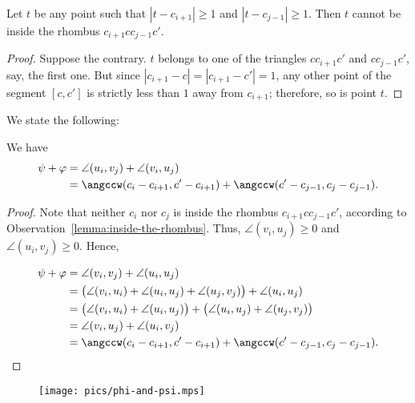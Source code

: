 \begin{enumerate}[label={\bf Case \arabic*: }, wide, labelwidth=!, labelindent=0pt]
\begin{observation} \label{lemma:inside-the-rhombus}
Let $t$ be any point such that $|t - c_{i+1}|\geq 1$ and $|t - c_{j-1}| \geq 1$. Then $t$ cannot be inside the rhombus $c_{i+1}cc_{j-1}c'$.
\end{observation}

\begin{proof}
Suppose the contrary. $t$ belongs to one of the triangles $cc_{i+1}c'$ and $cc_{j-1}c'$, say, the first one. But since $|c_{i+1} - c| = |c_{i+1} - c'| = 1$, any other point of the segment $[c, c']$ is strictly less than $1$ away from $c_{i+1}$; therefore, so is point $t$.
\end{proof}

We state the following:

\begin{observation} \label{lemma:psi-plus-phi} We have
\begin{align*}
\psi + \varphi & = \angle(u_i, v_j) + \angle(v_i, u_j) \\
& = \angccw(c_i - c_{i+1}, c' - c_{i+1}) + \angccw(c' - c_{j-1}, c_j - c_{j-1}).    
\end{align*}

\end{observation}

\begin{proof}
Note that neither $c_i$ nor $c_j$ is inside the rhombus $c_{i+1}cc_{j-1}c'$, according to Observation~\ref{lemma:inside-the-rhombus}. Thus, $\angle(v_i, u_j)\geq 0$ and $\angle(u_i, v_j)\geq 0$. Hence,

\begin{align*}
\psi + \varphi & = \angle(v_i, v_j) + \angle(u_i, u_j) \\
&= \big(\angle(v_i, u_i) + \angle(u_i, u_j) + \angle(u_j, v_j)\big) + \angle(u_i, u_j) \\
&= \big(\angle(v_i, u_i) + \angle(u_i, u_j)\big) + \big(\angle(u_i, u_j) + \angle(u_j, v_j)\big) \\
&= \angle(v_i, u_j) + \angle(u_i, v_j) \\
&= \angccw(c_i - c_{i+1}, c' - c_{i+1}) + \angccw(c' - c_{j-1}, c_j - c_{j-1}).
\end{align*}
\end{proof}


\begin{figure}[h!]
    \centering
    \texttt{[image: pics/phi-and-psi.mps]}
    \caption{}
    \label{fig:phi-and-psi}
\end{figure}


\end{enumerate}
